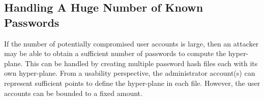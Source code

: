 \subsection{Handling A Huge Number of Known Passwords}

If the number of potentially compromised user accounts is large, then
an attacker may be able to obtain a sufficient number of passwords to 
compute the hyper-plane.   This can be handled by creating multiple
password hash files each with its own hyper-plane.   From a usability
perspective, the administrator account(s) can represent sufficient
points to define the hyper-plane in each file.   However, the user accounts
can be bounded to a fixed amount.


